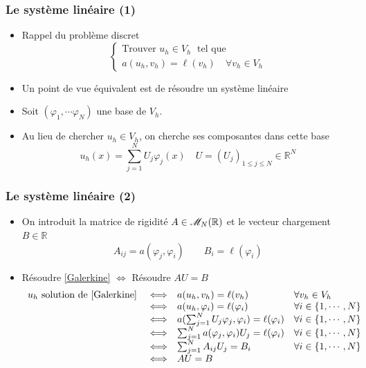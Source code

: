 \documentclass{beamer}
\begin{document}
\begin{frame}
\frametitle{Le système linéaire (1)}

\begin{itemize}
\item Rappel du problème discret
\begin{equation}
\left\{
\begin{array}{l}
\mbox{Trouver } u_h \in V_h\;\mbox{ tel que }\\
a(u_h,v_h)= \ell(v_h) \quad \forall v_h\in V_h
\end{array}
\right.
\label{Galerkine}
\end{equation}
\item Un point de vue équivalent est de résoudre un système linéaire
\item Soit $(\varphi_1, \cdots \varphi_N )$ une base de $V_h$.
\item Au lieu de chercher $u_h \in V_h$, on cherche ses composantes dans cette base
\[u_h(x)=\sum_{j=1}^NU_j\varphi_j(x)\quad U=(U_j)_{1\leq j\leq N}\in\mathbb{R}^N\]
\end{itemize}
\end{frame}
\begin{frame}
\frametitle{Le système linéaire (2)}

\begin{itemize}
\item On introduit la matrice de rigidité $A \in {\cal M}_N(\mathbb{R})$  et le vecteur chargement $B \in \mathbb{R}$
\[A_{ij}=a(\varphi_j,\varphi_i)\qquad B_i=\ell(\varphi_i)\]

\item Résoudre \eqref{Galerkine} $\Longleftrightarrow$ Résoudre $AU = B$
\[
\begin{array}{lcll}
u_h \mbox{ solution de \eqref{Galerkine} }& \Longleftrightarrow& a(u_h,v_h)=\ell(v_h)&\forall v_h\in V_h \\
& \Longleftrightarrow& a(u_h,\varphi_i)=\ell(\varphi_i)&\forall i\in \{1,\cdots,N\}\\
& \Longleftrightarrow& a(\sum_{j=1}^NU_j\varphi_j,\varphi_i)=\ell(\varphi_i)&\forall i\in \{1,\cdots,N\}\\
& \Longleftrightarrow& \sum_{j=1}^Na(\varphi_j,\varphi_i)U_j=\ell(\varphi_i)&\forall i\in \{1,\cdots,N\}\\
& \Longleftrightarrow& \sum_{j=1}^NA_{ij}U_j=B_i&\forall i\in \{1,\cdots,N\}\\
& \Longleftrightarrow& AU=B
\end{array}
\]
\end{itemize}
\end{frame}
\end{document}
